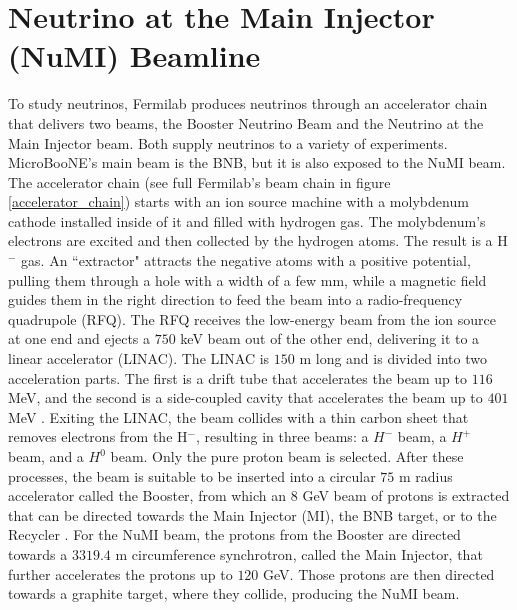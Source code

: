 \section{Neutrino at the Main Injector (NuMI) Beamline}
%
To study neutrinos, Fermilab produces neutrinos through an accelerator chain that delivers two beams, the Booster Neutrino Beam and the Neutrino at the Main Injector beam. Both supply neutrinos to a variety of experiments. MicroBooNE's main beam is the BNB,  but it is also exposed to the NuMI beam. 
%
The accelerator chain (see full Fermilab's beam chain in figure \ref{accelerator_chain}) starts with an ion source machine with a molybdenum cathode installed inside of it and filled with hydrogen gas. The molybdenum's electrons are excited and then collected by the hydrogen atoms. The result is a H$^-$ gas. An ``extractor" attracts the negative atoms with a positive potential, pulling them through a hole with a width of a few mm, while a magnetic field guides them in the right direction to feed the beam into a radio-frequency quadrupole (RFQ). The RFQ receives the low-energy beam from the ion source at one end and ejects a $750$ keV \cite{RFQ_website} beam out of the other end, delivering it to a linear accelerator (LINAC). The LINAC is $150$ m  long and is divided into two acceleration parts. The first is a drift tube that accelerates the beam up to $116$ MeV, and the second is a side-coupled cavity that accelerates the beam up to $401$ MeV \cite{LINAC_website}. Exiting the LINAC, the beam collides with a thin carbon sheet that removes electrons from the H$^-$, resulting in three beams: a $H^-$ beam, a $H^+$ beam, and a $H^0$ beam. Only the pure proton beam is selected. After these processes, the beam is suitable to be inserted into a circular $75$ m radius accelerator called the Booster, from which an $8$ GeV beam of protons is extracted that can be directed towards the Main Injector (MI), the BNB target, or to the Recycler \cite{booster_website}. For the NuMI beam, the protons from the Booster are directed towards a $3319.4$ m circumference synchrotron, called the Main Injector, that further accelerates the protons up to $120$ GeV. Those protons are then directed towards a graphite target, where they collide, producing the NuMI beam.
%
